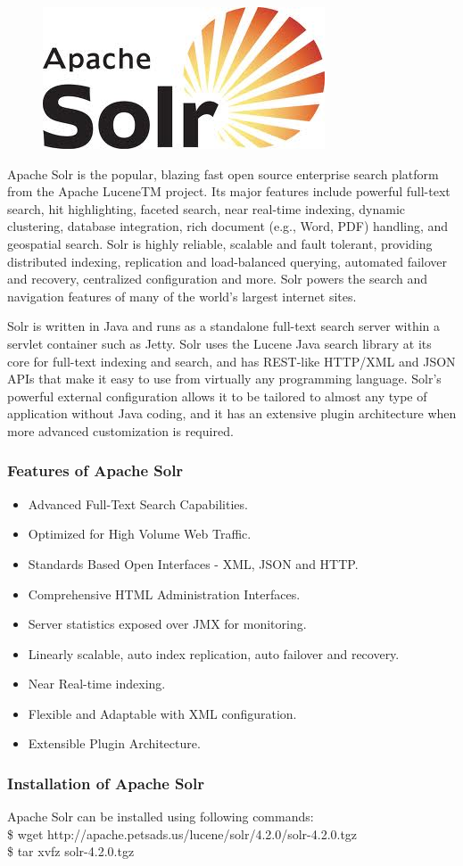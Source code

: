\begin{figure}[h]
\centering \includegraphics[scale=0.45]{images/solr.jpg}
\end{figure}
\noindent Apache Solr is the popular, blazing fast open source enterprise search 
platform from the Apache LuceneTM project. Its major features include 
powerful full-text search, hit highlighting, faceted search, near 
real-time indexing, dynamic clustering, database integration, rich 
document (e.g., Word, PDF) handling, and geospatial search. Solr is 
highly reliable, scalable and fault tolerant, providing distributed 
indexing, replication and load-balanced querying, automated failover 
and recovery, centralized configuration and more. Solr powers the 
search and navigation features of many of the world's largest internet 
sites.

Solr is written in Java and runs as a standalone full-text search server 
within a servlet container such as Jetty. Solr uses the Lucene Java 
search library at its core for full-text indexing and search, and has 
REST-like HTTP/XML and JSON APIs that make it easy to use from virtually 
any programming language. Solr's powerful external configuration allows 
it to be tailored to almost any type of application without Java coding, 
and it has an extensive plugin architecture when more advanced 
customization is required.
\subsubsection{Features of Apache Solr}
\begin{itemize}
\item Advanced Full-Text Search Capabilities.
\item Optimized for High Volume Web Traffic.
\item Standards Based Open Interfaces - XML, JSON and HTTP.
\item Comprehensive HTML Administration Interfaces.
\item Server statistics exposed over JMX for monitoring.
\item Linearly scalable, auto index replication, auto failover and recovery.
\item Near Real-time indexing.
\item Flexible and Adaptable with XML configuration.
\item Extensible Plugin Architecture.
\end{itemize}
\subsubsection{Installation of Apache Solr}
Apache Solr can be installed using following commands:\\

\hspace{4pt} \$ wget http://apache.petsads.us/lucene/solr/4.2.0/solr-4.2.0.tgz\\

\hspace{4pt} \$ tar xvfz solr-4.2.0.tgz
